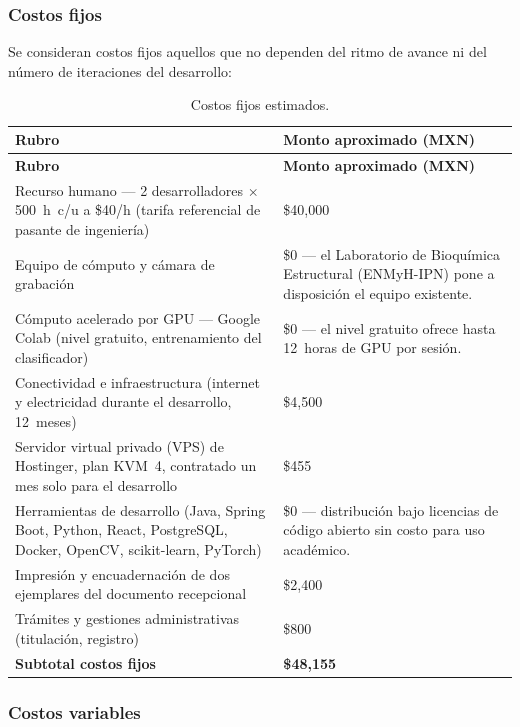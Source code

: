 \subsubsection{Costos fijos}

Se consideran costos fijos aquellos que no dependen del ritmo de avance ni del número
de iteraciones del desarrollo:

\begin{longtable}{|p{6.5cm}|p{6.8cm}|}
\caption{Costos fijos estimados.
\label{tab:costos_fijos}}\\
\hline
\textbf{Rubro} & \textbf{Monto aproximado (MXN)} \\
\hline
\endfirsthead
\hline
\textbf{Rubro} & \textbf{Monto aproximado (MXN)} \\
\hline
\endhead
\hline
\endfoot

Recurso humano --- 2 desarrolladores $\times$ 500~h~c/u a \$40/h
      (tarifa referencial de pasante de ingeniería)
    & \$40{,}000 \\
\hline
Equipo de cómputo y cámara de grabación
    & \$0 --- el Laboratorio de Bioquímica Estructural (ENMyH-IPN) pone a disposición
      el equipo existente. \\
\hline
Cómputo acelerado por GPU --- Google Colab (nivel gratuito, entrenamiento
      del clasificador)
    & \$0 --- el nivel gratuito ofrece hasta 12~horas de GPU por sesión. \\
\hline
Conectividad e infraestructura (internet y electricidad durante el desarrollo,
      12~meses)
    & \$4{,}500 \\
\hline
Servidor virtual privado (VPS) de Hostinger, plan KVM~4, contratado un mes
      solo para el desarrollo
    & \$455 \\
\hline
Herramientas de desarrollo (Java, Spring Boot, Python, React, PostgreSQL, Docker, OpenCV,
      scikit-learn, PyTorch)
    & \$0 --- distribución bajo licencias de código abierto sin costo para uso
      académico. \\
\hline
Impresión y encuadernación de dos ejemplares del documento recepcional
    & \$2{,}400 \\
\hline
Trámites y gestiones administrativas (titulación, registro)
    & \$800 \\
\hline
\textbf{Subtotal costos fijos} & \textbf{\$48{,}155} \\
\hline

\end{longtable}

\subsubsection{Costos variables}

